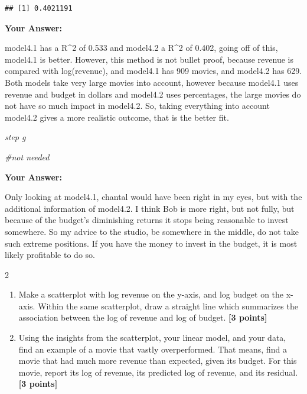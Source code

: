 \documentclass[
]{article}
\newenvironment{Shaded}{\begin{snugshade}}{\end{snugshade}}
\newcommand{\CommentTok}[1]{\textcolor[rgb]{0.56,0.35,0.01}{\textit{#1}}}
\newcommand{\FloatTok}[1]{\textcolor[rgb]{0.00,0.00,0.81}{#1}}
\newcommand{\FunctionTok}[1]{\textcolor[rgb]{0.13,0.29,0.53}{\textbf{#1}}}
\newcommand{\NormalTok}[1]{#1}
\newcommand{\SpecialCharTok}[1]{\textcolor[rgb]{0.81,0.36,0.00}{\textbf{#1}}}
\providecommand{\tightlist}{%
  \setlength{\itemsep}{0pt}\setlength{\parskip}{0pt}}
\begin{document}
\begin{Shaded}
\end{Shaded}

\begin{verbatim}
## [1] 0.4021191
\end{verbatim}

\textbf{Your Answer:}

model4.1 has a R\^{}2 of 0.533 and model4.2 a R\^{}2 of 0.402, going off
of this, model4.1 is better. However, this method is not bullet proof,
because revenue is compared with log(revenue), and model4.1 has 909
movies, and model4.2 has 629. Both models take very large movies into
account, however because model4.1 uses revenue and budget in dollars and
model4.2 uses percentages, the large movies do not have so much impact
in model4.2. So, taking everything into account model4.2 gives a more
realistic outcome, that is the better fit.

\emph{step g}

\begin{Shaded}
\begin{Highlighting}[]
\CommentTok{\#not needed}
\end{Highlighting}
\end{Shaded}

\textbf{Your Answer:}

Only looking at model4.1, chantal would have been right in my eyes, but
with the additional information of model4.2. I think Bob is more right,
but not fully, but because of the budget's diminishing returns it stops
being reasonable to invest somewhere. So my advice to the studio, be
somewhere in the middle, do not take such extreme positions. If you have
the money to invest in the budget, it is most likely profitable to do
so.

2

\begin{enumerate}
\def\labelenumi{\alph{enumi}.}
\tightlist
\item
  Make a scatterplot with log revenue on the y-axis, and log budget on
  the x-axis. Within the same scatterplot, draw a straight line which
  summarizes the association between the log of revenue and log of
  budget. \textbf{[3 points]}
\item
  Using the insights from the scatterplot, your linear model, and your
  data, find an example of a movie that vastly overperformed. That
  means, find a movie that had much more revenue than expected, given
  its budget. For this movie, report its log of revenue, its predicted
  log of revenue, and its residual. \textbf{[3 points]}
\end{enumerate}
\end{document}
